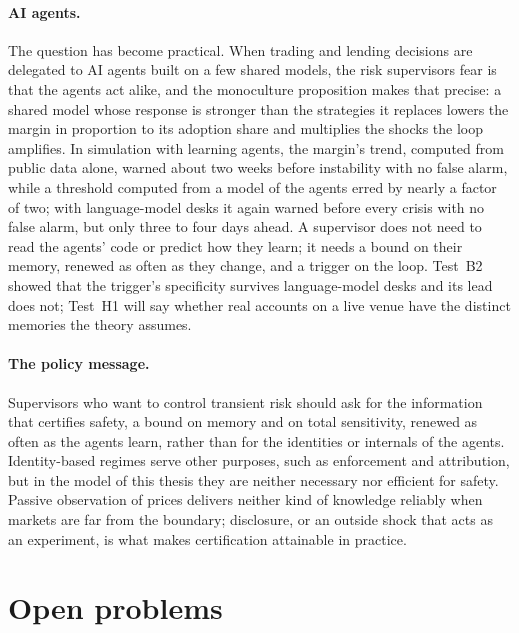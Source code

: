 \paragraph{AI agents.} The question has become practical. When trading and lending decisions are delegated to AI agents built on a few shared models, the risk supervisors fear is that the agents act alike, and the monoculture proposition makes that precise: a shared model whose response is stronger than the strategies it replaces lowers the margin in proportion to its adoption share and multiplies the shocks the loop amplifies. In simulation with learning agents, the margin's trend, computed from public data alone, warned about two weeks before instability with no false alarm, while a threshold computed from a model of the agents erred by nearly a factor of two; with language-model desks it again warned before every crisis with no false alarm, but only three to four days ahead. A supervisor does not need to read the agents' code or predict how they learn; it needs a bound on their memory, renewed as often as they change, and a trigger on the loop. Test~B2 showed that the trigger's specificity survives language-model desks and its lead does not; Test~H1 will say whether real accounts on a live venue have the distinct memories the theory assumes.

\paragraph{The policy message.} Supervisors who want to control transient risk should ask for the information that certifies safety, a bound on memory and on total sensitivity, renewed as often as the agents learn, rather than for the identities or internals of the agents. Identity-based regimes serve other purposes, such as enforcement and attribution, but in the model of this thesis they are neither necessary nor efficient for safety. Passive observation of prices delivers neither kind of knowledge reliably when markets are far from the boundary; disclosure, or an outside shock that acts as an experiment, is what makes certification attainable in practice.

\section{Open problems}\label{sec:open}

